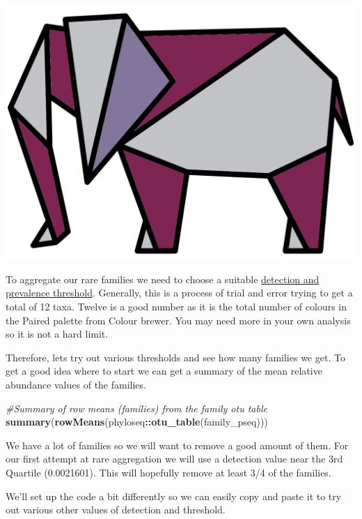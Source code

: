 \documentclass[
]{book}
\newenvironment{Shaded}{\begin{snugshade}}{\end{snugshade}}
\newcommand{\CommentTok}[1]{\textcolor[rgb]{0.56,0.35,0.01}{\textit{#1}}}
\newcommand{\FunctionTok}[1]{\textcolor[rgb]{0.13,0.29,0.53}{\textbf{#1}}}
\newcommand{\NormalTok}[1]{#1}
\newcommand{\SpecialCharTok}[1]{\textcolor[rgb]{0.81,0.36,0.00}{\textbf{#1}}}
\begin{document}
\includegraphics{figures/elephant_origami.png}

To aggregate our rare families we need to choose a suitable \protect\hyperlink{aggregateraretaxa}{detection and prevalence threshold}.
Generally, this is a process of trial and error trying to get a total of 12 taxa.
Twelve is a good number as it is the total number of colours in the Paired palette from Colour brewer.
You may need more in your own analysis so it is not a hard limit.

Therefore, lets try out various thresholds and see how many families we get.
To get a good idea where to start we can get a summary of the mean relative abundance values of the families.

\begin{Shaded}
\begin{Highlighting}[]
\CommentTok{\#Summary of row means (families) from the family otu table}
\FunctionTok{summary}\NormalTok{(}\FunctionTok{rowMeans}\NormalTok{(phyloseq}\SpecialCharTok{::}\FunctionTok{otu\_table}\NormalTok{(family\_pseq)))}
\end{Highlighting}
\end{Shaded}

We have a lot of families so we will want to remove a good amount of them.
For our first attempt at rare aggregation we will use a detection value near the 3rd Quartile (0.0021601).
This will hopefully remove at least 3/4 of the families.

We'll set up the code a bit differently so we can easily copy and paste it to try out various other values of detection and threshold.
\end{document}
